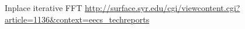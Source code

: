 Inplace iterative FFT
\url{http://surface.syr.edu/cgi/viewcontent.cgi?article=1136&context=eecs_techreports}